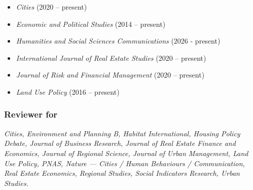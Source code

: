 \documentclass[11pt,a4paper]{article}
\providecommand{\tightlist}{%
  \setlength{\itemsep}{1pt}\setlength{\parskip}{0pt}}
\begin{document}
\begin{itemize}
\tightlist
\item
  \emph{Cities} (2020 -- present)
\item
  \emph{Economic and Political Studies} (2014 -- present)
\item
  \emph{Humanities and Social Sciences Communications} (2026 - present)
\item
  \emph{International Journal of Real Estate Studies} (2020 -- present)
\item
  \emph{Journal of Risk and Financial Management} (2020 -- present)
\item
  \emph{Land Use Policy} (2016 -- present)
\end{itemize}

\subsubsection{Reviewer for}\label{reviewer-for}

\emph{Cities, Environment and Planning B, Habitat International, Housing
Policy Debate, Journal of Business Research, Journal of Real Estate
Finance and Economics, Journal of Regional Science, Journal of Urban
Management, Land Use Policy, PNAS, Nature --- Cities / Human Behaviours
/ Communication, Real Estate Economics, Regional Studies, Social
Indicators Research, Urban Studies.}
\end{document}
